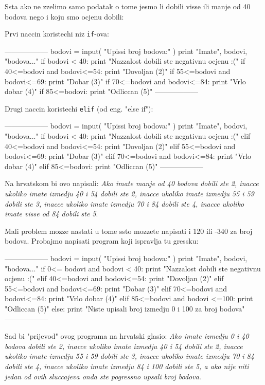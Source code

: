 Ssta ako ne zzelimo samo podatak o tome jesmo li dobili visse ili
manje od 40 bodova nego i koju smo ocjenu dobili:

Prvi naccin koristechi niz \verb"if"-ova:

------------------
bodovi = input( "Upissi broj bodova:" )
print "Imate", bodovi, "bodova..."
if bodovi < 40:
	print "Nazzalost dobili ste negativnu ocjenu :("
if 40<=bodovi and bodovi<=54:
	print "Dovoljan (2)"
if 55<=bodovi and bodovi<=69:
	print "Dobar (3)"
if 70<=bodovi and bodovi<=84:
	print "Vrlo dobar (4)"
if 85<=bodovi:
	print "Odliccan (5)"
------------------

Drugi naccin koristechi \verb"elif" (od eng. "else if"):

------------------
bodovi = input( "Upissi broj bodova:" )
print "Imate", bodovi, "bodova..."
if bodovi < 40:
	print "Nazzalost dobili ste negativnu ocjenu :("
elif 40<=bodovi and bodovi<=54:
	print "Dovoljan (2)"
elif 55<=bodovi and bodovi<=69:
	print "Dobar (3)"
elif 70<=bodovi and bodovi<=84:
	print "Vrlo dobar (4)"
elif 85<=bodovi:
	print "Odliccan (5)"
------------------

Na hrvatskom bi ovo napisali: \emph{Ako imate manje od 40 bodova dobili ste 2, inacce ukoliko imate
izmedju 40 i 54 dobili ste 2, inacce ukoliko imate izmedju 55 i 59 dobili ste 3, inacce ukoliko imate
izmedju 70 i 84 dobili ste 4, inacce ukoliko imate visse od 84 dobili ste 5}.

Mali problem mozze nastati u tome ssto mozzete napisati i 120 ili -340 za broj bodova. Probajmo
napisati program koji ispravlja tu gressku:

------------------
bodovi = input( "Upissi broj bodova:" )
print "Imate", bodovi, "bodova..."
if 0<= bodovi and bodovi < 40:
	print "Nazzalost dobili ste negativnu ocjenu :("
elif 40<=bodovi and bodovi<=54:
	print "Dovoljan (2)"
elif 55<=bodovi and bodovi<=69:
	print "Dobar (3)"
elif 70<=bodovi and bodovi<=84:
	print "Vrlo dobar (4)"
elif 85<=bodovi and bodovi <=100:
	print "Odliccan (5)"
else:
	print "Niste upisali broj izmedju 0 i 100 za broj bodova"
------------------

Sad bi "prijevod" ovog programa na hrvatski glasio: \emph{Ako imate
izmedju 0 i 40 bodova dobili ste 2, inacce ukoliko imate izmedju
40 i 54 dobili ste 2, inacce ukoliko imate izmedju 55 i 59 dobili
ste 3, inacce ukoliko imate izmedju 70 i 84 dobili ste 4, inacce
ukoliko imate izmedju 84 i 100 dobili ste 5, a ako nije niti jedan
od ovih sluccajeva onda ste pogressno upsali broj bodova}.

